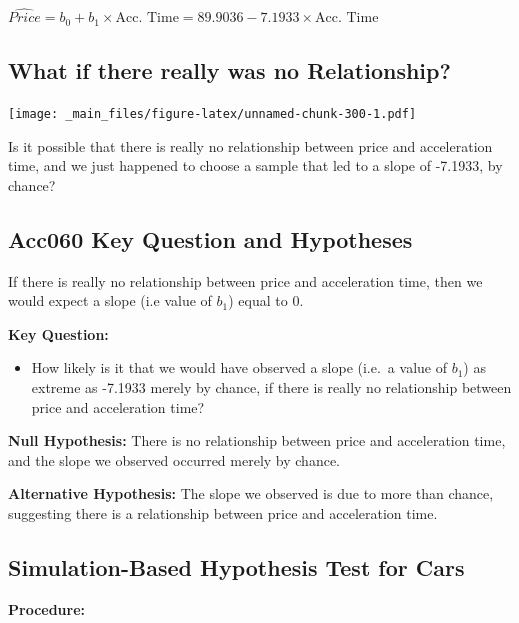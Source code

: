 \documentclass[]{book}
\providecommand{\tightlist}{%
  \setlength{\itemsep}{0pt}\setlength{\parskip}{0pt}}
\begin{document}
\(\widehat{Price} = b_0+b_1\times \text{Acc. Time} =89.9036 -7.1933\times\text{Acc. Time}\)

\subsection{What if there really was no
Relationship?}\label{what-if-there-really-was-no-relationship}

\texttt{[image: \_main\_files/figure-latex/unnamed-chunk-300-1.pdf]}

Is it possible that there is really no relationship between price and
acceleration time, and we just happened to choose a sample that led to a
slope of -7.1933, by chance?

\subsection{Acc060 Key Question and
Hypotheses}\label{acc060-key-question-and-hypotheses}

If there is really no relationship between price and acceleration time,
then we would expect a slope (i.e value of \(b_1\)) equal to 0.

\textbf{Key Question:}

\begin{itemize}
\tightlist
\item
  How likely is it that we would have observed a slope (i.e.~a value of
  \(b_1\)) as extreme as -7.1933 merely by chance, if there is really no
  relationship between price and acceleration time?
\end{itemize}

\textbf{Null Hypothesis:} There is no relationship between price and
acceleration time, and the slope we observed occurred merely by chance.

\textbf{Alternative Hypothesis:} The slope we observed is due to more
than chance, suggesting there is a relationship between price and
acceleration time.

\subsection{Simulation-Based Hypothesis Test for
Cars}\label{simulation-based-hypothesis-test-for-cars}

\textbf{Procedure:}
\end{document}
